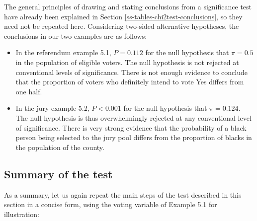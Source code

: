 \documentclass[11pt,a4paper,openany]{book}
\begin{document}
The general principles of drawing and stating conclusions from a
significance test have already been explained in Section
\ref{ss-tables-chi2test-conclusions}, so they need not be repeated here.
Considering two-sided alternative hypotheses, the conclusions in our two
examples are as follows:

\begin{itemize}
\item
  In the referendum example 5.1, \(P=0.112\) for the null hypothesis
  that \(\pi=0.5\) in the population of eligible voters. The null
  hypothesis is not rejected at conventional levels of significance.
  There is not enough evidence to conclude that the proportion of voters
  who definitely intend to vote Yes differs from one half.
\item
  In the jury example 5.2, \(P<0.001\) for the null hypothesis that
  \(\pi=0.124\). The null hypothesis is thus overwhelmingly rejected at
  any conventional level of significance. There is very strong evidence
  that the probability of a black person being selected to the jury pool
  differs from the proportion of blacks in the population of the county.
\end{itemize}

\subsection{Summary of the test}\label{ss-probs-test1sample-summary}

As a summary, let us again repeat the main steps of the test described
in this section in a concise form, using the voting variable of Example
5.1 for illustration:
\end{document}
